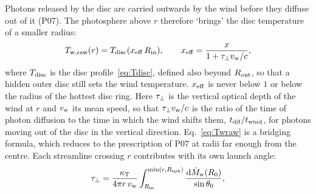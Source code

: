 


Photons released by the disc are carried outwards by the wind before they diffuse out of it (P07).
The photosphere above $r$ therefore `brings' the disc temperature of a smaller radius:
\begin{equation}
T_{\rm w,raw}(r) = T_{\rm disc}(x_{\rm eff}\,R_{\rm in}), \qquad x_{\rm eff} = \frac{x}{1 + \tau_\perp v_{\rm w}/c} ,
\label{eq:Twraw}
\end{equation}
where $T_{\rm disc}$ is the disc profile~\eqref{eq:Tdisc}, defined also beyond $R_{\rm out}$, so that a hidden outer disc still sets the wind temperature.
$x_{\rm eff}$ is never below $1$ or below the radius of the hottest disc ring.
Here $\tau_\perp$ is the vertical optical depth of the wind at $r$ and $v_{\rm w}$ its mean speed, so that $\tau_\perp v_{\rm w}/c$ is the ratio of the time of photon diffusion to the time in which the wind shifts them, $t_{\rm dif}/t_{\rm wind}$, for photons moving out of the disc in the vertical direction.
Eq.~\eqref{eq:Twraw} is a bridging formula, which reduces to the prescription of P07 at radii far enough from the centre.
Each streamline crossing $r$ contributes with its own launch angle:
\begin{equation}
\tau_\perp = \frac{\kappa_{\rm T}}{4\pi r\,v_{\rm w}} \int_{R_{\rm in}}^{\min(r, R_{\rm sph})} \frac{{\rm d}\dot M_{\rm w}(R_0)}{\sin\theta_0} ,
\label{eq:tauperp}
\end{equation}
